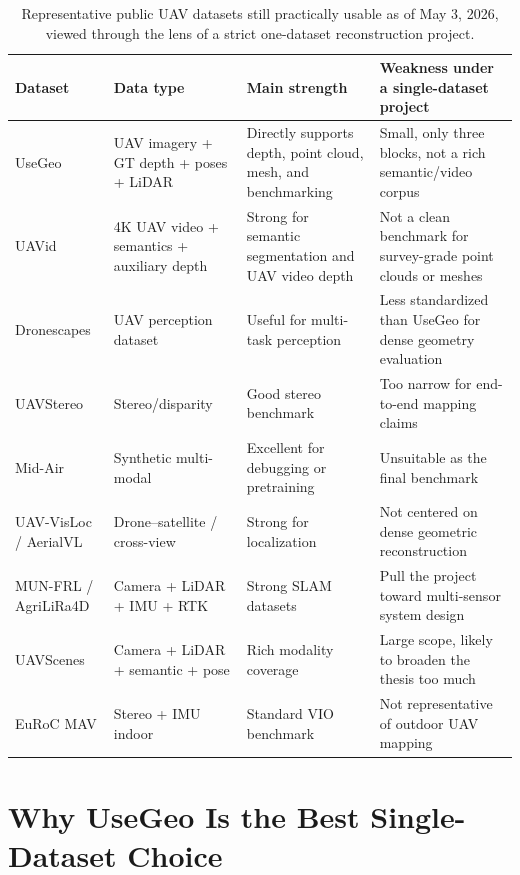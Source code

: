 \documentclass[11pt,a4paper]{article}
\begin{document}
\begin{table}[t]
\centering
\small
\begin{tabularx}{\textwidth}{>{\raggedright\arraybackslash}p{2.2cm} >{\raggedright\arraybackslash}p{1.8cm} >{\raggedright\arraybackslash}X >{\raggedright\arraybackslash}X}
\toprule
\textbf{Dataset} & \textbf{Data type} & \textbf{Main strength} & \textbf{Weakness under a single-dataset project} \\
\midrule
UseGeo & UAV imagery + GT depth + poses + LiDAR & Directly supports depth, point cloud, mesh, and benchmarking & Small, only three blocks, not a rich semantic/video corpus \\
UAVid & 4K UAV video + semantics + auxiliary depth & Strong for semantic segmentation and UAV video depth & Not a clean benchmark for survey-grade point clouds or meshes \\
Dronescapes & UAV perception dataset & Useful for multi-task perception & Less standardized than UseGeo for dense geometry evaluation \\
UAVStereo & Stereo/disparity & Good stereo benchmark & Too narrow for end-to-end mapping claims \\
Mid-Air & Synthetic multi-modal & Excellent for debugging or pretraining & Unsuitable as the final benchmark \\
UAV-VisLoc / AerialVL & Drone--satellite / cross-view & Strong for localization & Not centered on dense geometric reconstruction \\
MUN-FRL / AgriLiRa4D & Camera + LiDAR + IMU + RTK & Strong SLAM datasets & Pull the project toward multi-sensor system design \\
UAVScenes & Camera + LiDAR + semantic + pose & Rich modality coverage & Large scope, likely to broaden the thesis too much \\
EuRoC MAV & Stereo + IMU indoor & Standard VIO benchmark & Not representative of outdoor UAV mapping \\
\bottomrule
\end{tabularx}
\caption{Representative public UAV datasets still practically usable as of May 3, 2026, viewed through the lens of a strict one-dataset reconstruction project.}
\end{table}

\section{Why UseGeo Is the Best Single-Dataset Choice}
\end{document}
